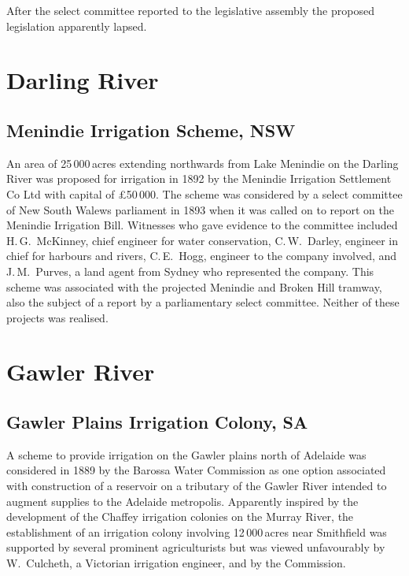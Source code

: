 After the select committee reported to the legislative assembly the
proposed legislation apparently lapsed.

\section*{Darling River}

\subsection*{Menindie Irrigation Scheme, NSW}

An area of 25\,000\,acres extending northwards from Lake Menindie on
the Darling River was proposed for irrigation in 1892 by the Menindie
Irrigation Settlement Co Ltd with capital of \pounds50\,000.  The
scheme was considered by a select committee of New South Walews
parliament in 1893 when it was called on to report on the Menindie
Irrigation Bill.  Witnesses who gave evidence to the committee
included H.\,G.~McKinney, chief engineer for water conservation,
C.\,W.~Darley, engineer in chief for harbours and rivers, C.\,E.~Hogg,
engineer to the company involved, and J.\,M.~Purves, a land agent from
Sydney who represented the company.  This scheme was associated with
the projected Menindie and Broken Hill tramway, also the subject of a
report by a parliamentary select committee.  Neither of these projects
was realised.

\section*{Gawler River}

\subsection*{Gawler Plains Irrigation Colony, SA}

A scheme to provide irrigation on the Gawler plains north of Adelaide
was considered in 1889 by the Barossa Water Commission as one option
associated with construction of a reservoir on a tributary of the
Gawler River intended to augment supplies to the Adelaide metropolis.
Apparently inspired by the development of the Chaffey irrigation
colonies on the Murray River, the establishment of an irrigation
colony involving 12\,000\,acres near Smithfield was supported by several
prominent agriculturists but was viewed unfavourably by W.~Culcheth, a
Victorian irrigation engineer, and by the Commission.

